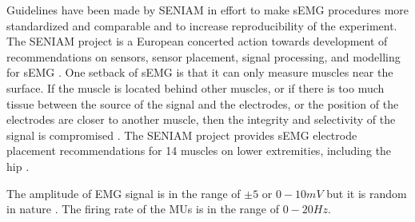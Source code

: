 \documentclass[../main.tex]{subfiles}
\begin{document}
Guidelines have been made by \ac{SENIAM} in effort to make \ac{sEMG} procedures more standardized and comparable and to increase reproducibility of the experiment. 
The \ac{SENIAM} project is a European concerted action towards development of recommendations on sensors, sensor placement, signal processing, and modelling for \ac{sEMG} \cite{Hermens1999, Hermens2000}.
One setback of \ac{sEMG} is that it can only measure muscles near the surface.
If the muscle is located behind other muscles, or if there is too much tissue between the source of the signal and the electrodes, or the position of the electrodes are closer to another muscle, then the integrity and selectivity of the signal is compromised \cite{Farina2016, Hermens2000}.
The \ac{SENIAM} project provides \ac{sEMG} electrode placement recommendations for 14 muscles on lower extremities, including the hip \cite{Hermens1999}.

The amplitude of \ac{EMG} signal is in the range of $\pm 5$ or $0-10 mV$ but it is random in nature \cite{Raez2006}.
The firing rate of the \acp{MU} is in the range of $0-20Hz$.
\end{document}
